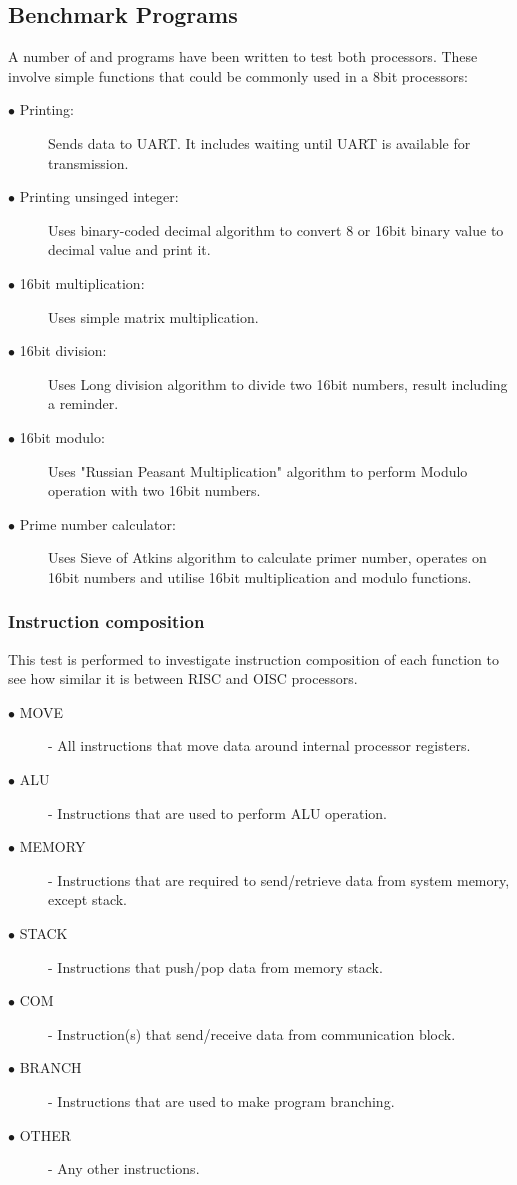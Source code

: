 \subsection{Benchmark Programs}
A number of and programs have been written to test both processors. These involve simple functions that could be commonly used in a 8bit processors:

\begin{description}
	\item[$\bullet$ Printing:] Sends data to UART. It includes waiting until UART is available for transmission. 
	\item[$\bullet$ Printing unsinged integer:] Uses binary-coded decimal algorithm to convert 8 or 16bit binary value to decimal value and print it. 
	\item[$\bullet$ 16bit multiplication:] Uses simple matrix multiplication. 
	\item[$\bullet$ 16bit division:] Uses Long division algorithm to divide two 16bit numbers, result including a reminder.
	\item[$\bullet$ 16bit modulo:] Uses "Russian Peasant Multiplication" algorithm to perform Modulo operation with two 16bit numbers.
	\item[$\bullet$ Prime number calculator:] Uses Sieve of Atkins algorithm \autocite{morain_1989} to calculate primer number, operates on 16bit numbers and utilise 16bit multiplication and modulo functions. 
\end{description}


\subsubsection{Instruction composition}\label{subsec:instr_comp}

This test is performed to investigate instruction composition of each function to see how similar it is between RISC and OISC processors. 
\begin{description}
	\item[$\bullet$ MOVE] - All instructions that move data around internal processor registers.
	\item[$\bullet$ ALU] - Instructions that are used to perform ALU operation.
	\item[$\bullet$ MEMORY] - Instructions that are required to send/retrieve data from system memory, except stack.
	\item[$\bullet$ STACK] - Instructions that push/pop data from memory stack.
	\item[$\bullet$ COM] - Instruction(s) that send/receive data from communication block.
	\item[$\bullet$ BRANCH] - Instructions that are used to make program branching.
	\item[$\bullet$ OTHER] - Any other instructions.
\end{description}

